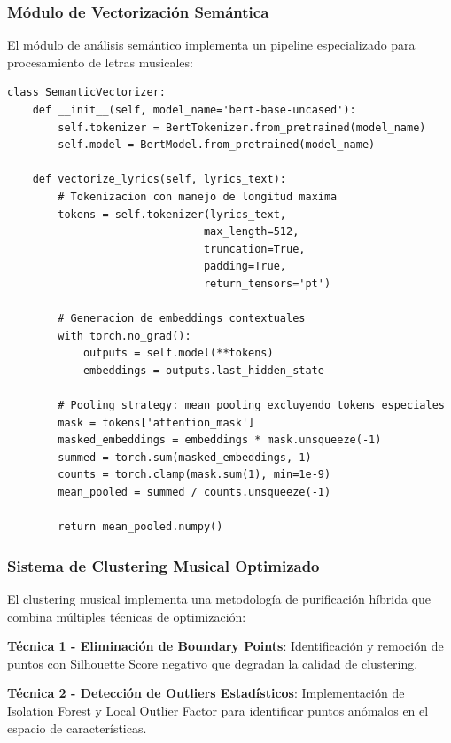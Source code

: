 \documentclass[12pt,a4paper]{article}
\begin{document}
\subsubsection{Módulo de Vectorización Semántica}

El módulo de análisis semántico implementa un pipeline especializado para procesamiento de letras musicales:

\begin{lstlisting}[style=pythonstyle]
class SemanticVectorizer:
    def __init__(self, model_name='bert-base-uncased'):
        self.tokenizer = BertTokenizer.from_pretrained(model_name)
        self.model = BertModel.from_pretrained(model_name)
        
    def vectorize_lyrics(self, lyrics_text):
        # Tokenizacion con manejo de longitud maxima
        tokens = self.tokenizer(lyrics_text, 
                               max_length=512, 
                               truncation=True, 
                               padding=True, 
                               return_tensors='pt')
        
        # Generacion de embeddings contextuales
        with torch.no_grad():
            outputs = self.model(**tokens)
            embeddings = outputs.last_hidden_state
            
        # Pooling strategy: mean pooling excluyendo tokens especiales
        mask = tokens['attention_mask']
        masked_embeddings = embeddings * mask.unsqueeze(-1)
        summed = torch.sum(masked_embeddings, 1)
        counts = torch.clamp(mask.sum(1), min=1e-9)
        mean_pooled = summed / counts.unsqueeze(-1)
        
        return mean_pooled.numpy()
\end{lstlisting}

\subsubsection{Sistema de Clustering Musical Optimizado}

El clustering musical implementa una metodología de purificación híbrida que combina múltiples técnicas de optimización:

\textbf{Técnica 1 - Eliminación de Boundary Points}: Identificación y remoción de puntos con Silhouette Score negativo que degradan la calidad de clustering.

\textbf{Técnica 2 - Detección de Outliers Estadísticos}: Implementación de Isolation Forest y Local Outlier Factor para identificar puntos anómalos en el espacio de características.
\end{document}
